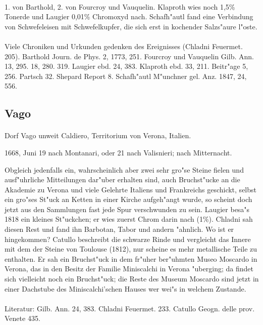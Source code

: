 \documentclass[a4paper, 11pt, oneside]{article}
\begin{document}
\paragraph{}
1. von Barthold, 2. von Fourcroy und Vauquelin. Klaproth wies noch 1,5\% Tonerde und Laugier 0,01\% Chromoxyd nach. Schafh"autl fand eine Verbindung von Schwefeleisen mit Schwefelkupfer, die sich erst in kochender Salzs"aure l"oste.
\footnotesize
\paragraph{}
Viele Chroniken und Urkunden gedenken des Ereignisses (Chladni Feuermet. 205). Barthold Journ. de Phys. 2, 1773, 251. Fourcroy und Vauquelin Gilb. Ann. 13, 295. 18, 280. 319. Laugier ebd. 24, 383. Klaproth ebd. 33, 211. Beitr"age 5, 256. Partsch 32. Shepard Report 8. Schafh"autl M"unchner gel. Anz. 1847, 24, 556.
\subsection{Vago}
\normalsize
\paragraph{}
Dorf Vago unweit Caldiero, Territorium von Verona, Italien.

1668, Juni 19 nach Montanari, oder 21 nach Valisnieri; nach Mitternacht.

Obgleich jedenfalls ein, wahrscheinlich aber zwei sehr gro"se Steine fielen und ausf"uhrliche Mitteilungen dar"uber erhalten sind, auch Bruchst"ucke an die Akademie zu Verona und viele Gelehrte Italiens und Frankreichs geschickt, selbst ein gro"ses St"uck an Ketten in einer Kirche aufgeh"angt wurde, so scheint doch jetzt aus den Sammlungen fast jede Spur verschwunden zu sein. Laugier besa"s 1818 ein kleines St"uckchen; er wies zuerst Chrom darin nach (1\%). Chladni sah diesen Rest und fand ihn Barbotan, Tabor und andern "ahnlich. Wo ist er hingekommen? Catullo beschreibt die schwarze Rinde und vergleicht das Innere mit dem der Steine von Toulouse (1812), nur scheine es mehr metallische Teile zu enthalten. Er sah ein Bruchst"uck in dem fr"uher ber"uhmten Museo Moscardo in Verona, das in den Besitz der Familie Miniscalchi in Verona "uberging; da findet sich vielleicht noch ein Bruchst"uck; die Reste des Museum Moscardo sind jetzt in einer Dachstube des Miniscalchi'schen Hauses wer wei"s in welchem Zustande.
\footnotesize
\paragraph{}
Literatur: Gilb. Ann. 24, 383. Chladni Feuermet. 233. Catullo Geogn. delle prov. Venete 435.
\end{document}
